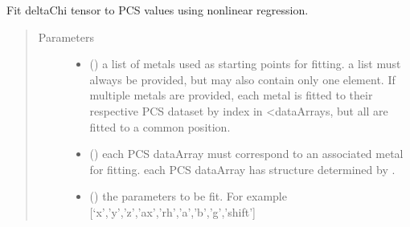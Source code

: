 \documentclass[a4paper,10pt,english,openany,oneside]{sphinxmanual}
\begin{document}
\begin{fulllineitems}
\label{\detokenize{reference/generated/paramagpy.fit.nlr_fit_metal_from_pcs:paramagpy.fit.nlr_fit_metal_from_pcs}}
\sphinxAtStartPar
Fit deltaChi tensor to PCS values using non\sphinxhyphen{}linear regression.
\begin{quote}\begin{description}
\item[{Parameters}] \leavevmode\begin{itemize}
\item {} 
\sphinxAtStartPar
{} () \textendash{} a list of metals used as starting points for fitting.
a list must always be provided, but may also contain
only one element. If multiple metals are provided, each metal
is fitted to their respective PCS dataset by index in \textless{}dataArrays,
but all are fitted to a common position.

\item {} 
\sphinxAtStartPar
{} () \textendash{} each PCS dataArray must correspond to an associated metal for fitting.
each PCS dataArray has structure determined by
{\hyperref[\detokenize{reference/generated/paramagpy.protein.CustomStructure.parse:paramagpy.protein.CustomStructure.parse}]{}}.

\item {} 
\sphinxAtStartPar
{} () \textendash{} the parameters to be fit.
For example {[}‘x’,’y’,’z’,’ax’,’rh’,’a’,’b’,’g’,’shift’{]}


\end{itemize}
\end{description}
\end{quote}
\end{fulllineitems}
\end{document}
